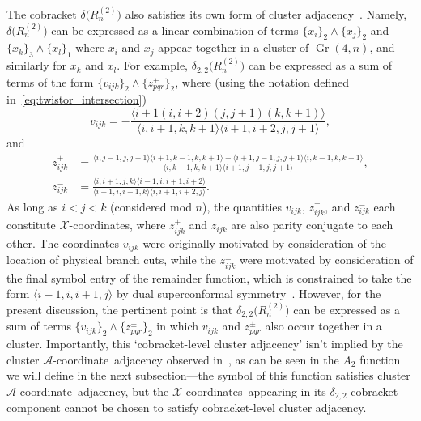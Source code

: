 \documentclass[12pt]{article}
\DeclareMathOperator{\Gr}{Gr}
\def\ket#1{\langle #1 \rangle}
\def\xcoords{$\mathcal{X}$-coordinates}
\def\acoord{$\mathcal{A}$-coordinate}
\begin{document}
The cobracket $\delta\big(R^{(2)}_n\big)$ also satisfies its own form of cluster adjacency~\cite{Golden:2014pua}. Namely, $\delta\big(R^{(2)}_n\big)$ can be expressed as a linear combination of terms $\{x_i\}_2 \wedge \{x_j\}_2$ and $\{x_k\}_3 \wedge \{x_l\}_1$ where $x_i$ and $x_j$ appear together in a cluster of $\Gr(4,n)$, and similarly for $x_k$ and $x_l$. For example, $\delta_{2,2}\big(R^{(2)}_n\big)$ can be expressed as a sum of terms of the form $\{ v_{ijk} \}_2 \wedge \{ z^{\pm}_{pqr} \}_2$, where (using the notation defined in~\eqref{eq:twistor_intersection})
\begin{equation}
v_{ijk} = - \frac{\ket{i\!+\!1 (i,i\!+\!2) (j,j\!+\!1)(k,k\!+\!1)}}{\ket{i,i\!+\!1,k,k\!+\!1}\ket{i\!+\!1,i\!+\!2,j,j\!+\!1}},
\end{equation}
and
\begin{align}
z_{ijk}^+ &= \frac{\ket{i,j\!-\!1,j,j\!+\!1}\ket{i\!+\!1,k\!-\!1,k,k\!+\!1}  -  \ket{i\!+\!1,j\!-\!1,j,j\!+\!1}\ket{i,k\!-\!1,k,k\!+\!1}}{\ket{i,k\!-\!1,k,k\!+\!1}\ket{i\!+\!1,j\!-\!1,j,j\!+\!1}}, \nonumber \\
z_{ijk}^- &= \frac{\ket{i,i\!+\!1,j,k}\ket{i\!-\!1,i,i\!+\!1,i\!+\!2}}{\ket{i\!-\!1,i,i\!+\!1,k}\ket{i,i\!+\!1,i\!+\!2,j}}.
\end{align}
As long as $i<j<k$ (considered mod $n$), the quantities $v_{ijk}$, $z_{ijk}^+$, and $z_{ijk}^-$ each constitute \xcoords, where $z_{ijk}^+$ and $z_{ijk}^-$ are also parity conjugate to each other. The coordinates $v_{ijk}$ were originally motivated by consideration of the location of physical branch cuts, while the $z_{ijk}^\pm$ were motivated by consideration of the final symbol entry of the remainder function, which is constrained to take the form $\ket{i-1,i,i+1,j}$ by dual superconformal symmetry~\cite{CaronHuot:2011kk}. However, for the present discussion, the pertinent point is that $\delta_{2,2}\big(R^{(2)}_n\big)$ can be expressed as a sum of terms $\{ v_{ijk} \}_2 \wedge \{ z^{\pm}_{pqr} \}_2$ in which $v_{ijk}$ and $z^{\pm}_{pqr}$ also occur together in a cluster. Importantly, this `cobracket-level cluster adjacency' isn't implied by the cluster \acoord\ adjacency observed in~\cite{Drummond:2017ssj}, as can be seen in the $A_2$ function we will define in the next subsection---the symbol of this function satisfies cluster \acoord\ adjacency, but the \xcoords\ appearing in its $\delta_{2,2}$ cobracket component cannot be chosen to satisfy cobracket-level cluster adjacency.
\end{document}
